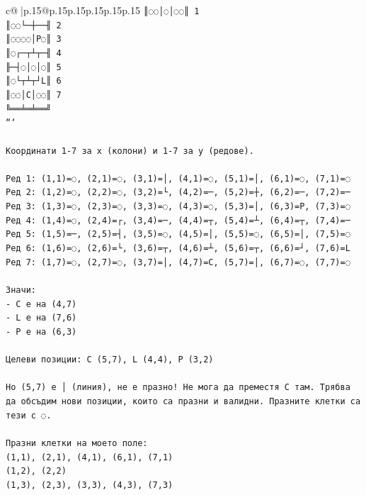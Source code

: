 \documentclass{article}
\begin{document}
{\begin{supertabular}{c@{$\;$}|p{.15\linewidth}@{}p{.15\linewidth}p{.15\linewidth}p{.15\linewidth}p{.15\linewidth}p{.15\linewidth}}
{{{\texttt{║◌◌│◌│◌◌║ 1} \\
\texttt{║◌◌└─┼──╢ 2} \\
\texttt{║◌◌◌◌│P◌║ 3} \\
\texttt{║◌┌─┬┴┬─╢ 4} \\
\texttt{╟─┤◌│◌│◌║ 5} \\
\texttt{║◌└┬┴┬┘L║ 6} \\
\texttt{║◌◌│C│◌◌║ 7} \\
\texttt{╚══╧═╧══╝} \\
\texttt{```} \\
\\ 
\texttt{Координати 1{-}7 за x (колони) и 1{-}7 за y (редове).} \\
\\ 
\texttt{Ред 1: (1,1)=◌, (2,1)=◌, (3,1)=│, (4,1)=◌, (5,1)=│, (6,1)=◌, (7,1)=◌} \\
\texttt{Ред 2: (1,2)=◌, (2,2)=◌, (3,2)=└, (4,2)=─, (5,2)=┼, (6,2)=─, (7,2)=─} \\
\texttt{Ред 3: (1,3)=◌, (2,3)=◌, (3,3)=◌, (4,3)=◌, (5,3)=│, (6,3)=P, (7,3)=◌} \\
\texttt{Ред 4: (1,4)=◌, (2,4)=┌, (3,4)=─, (4,4)=┬, (5,4)=┴, (6,4)=┬, (7,4)=─} \\
\texttt{Ред 5: (1,5)=─, (2,5)=┤, (3,5)=◌, (4,5)=│, (5,5)=◌, (6,5)=│, (7,5)=◌} \\
\texttt{Ред 6: (1,6)=◌, (2,6)=└, (3,6)=┬, (4,6)=┴, (5,6)=┬, (6,6)=┘, (7,6)=L} \\
\texttt{Ред 7: (1,7)=◌, (2,7)=◌, (3,7)=│, (4,7)=C, (5,7)=│, (6,7)=◌, (7,7)=◌} \\
\\ 
\texttt{Значи:} \\
\texttt{{-} C е на (4,7)} \\
\texttt{{-} L е на (7,6)} \\
\texttt{{-} P е на (6,3)} \\
\\ 
\texttt{Целеви позиции: C (5,7), L (4,4), P (3,2)} \\
\\ 
\texttt{Но (5,7) е │ (линия), не е празно! Не мога да преместя C там. Трябва да обсъдим нови позиции, които са празни и валидни. Празните клетки са тези с ◌.} \\
\\ 
\texttt{Празни клетки на моето поле:} \\
\texttt{(1,1), (2,1), (4,1), (6,1), (7,1)} \\
\texttt{(1,2), (2,2)} \\
\texttt{(1,3), (2,3), (3,3), (4,3), (7,3)} \\
}}}
\end{supertabular}}
\end{document}
